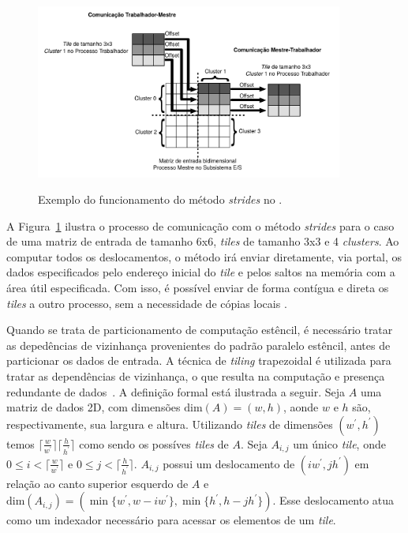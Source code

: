 \begin{figure}[t]
	\centering
    \caption{Exemplo do funcionamento do método \textit{strides} no \mppa.}
	\includegraphics[width=0.9\textwidth]{figs/stridesImage.pdf} \\
	\label{fig:strides}
\end{figure}


A Figura~\ref{fig:strides} ilustra o processo de comunicação com o método \textit{strides} para o caso de uma matriz de entrada de tamanho 6x6, \textit{tiles} de tamanho 3x3 e 4 \textit{clusters}. Ao computar todos os deslocamentos, o método irá enviar diretamente, via portal, os dados especificados pelo endereço inicial do \textit{tile} e pelos saltos na memória com a área útil especificada. Com isso, é possível enviar de forma contígua e direta os \textit{tiles} a outro processo, sem a necessidade de cópias locais \cite{Podesta:TCC}.

Quando se trata de particionamento de computação estêncil, é necessário tratar as depedências de vizinhança provenientes do padrão paralelo estêncil, antes de particionar os dados de entrada. A técnica de \textit{tiling} trapezoidal é utilizada para tratar as dependências de vizinhança, o que resulta na computação e presença redundante de dados~\cite{Rocha:2017}. A definição formal está ilustrada a seguir.
Seja $A$ uma matriz de dados 2D, com dimensões $\textrm{dim}(A) = (w, h)$, aonde $w$ e $h$ são, respectivamente, sua largura e altura.
Utilizando \emph{tiles} de dimensões $(w^\prime, h^\prime)$ temos $\lceil\frac{w}{w^\prime}\rceil\lceil\frac{h}{h^\prime}\rceil$ como sendo os possíves \emph{tiles} de $A$.
Seja $A_{i,j}$ um único \emph{tile}, onde $0\leq i < \lceil\frac{w}{ w^\prime}\rceil$ e $0\leq j < \lceil\frac{h}{ h^\prime}\rceil$.
$A_{i,j}$ possui um deslocamento de $(i w^\prime,j h^\prime)$ em relação ao canto superior esquerdo de $A$ e $\textrm{dim}(A_{i,j}) = (\min\{w^\prime, w-i w^\prime\}, \min\{h^\prime, h-j h^\prime\})$.
Esse deslocamento atua como um indexador necessário para acessar os elementos de um \emph{tile}.

